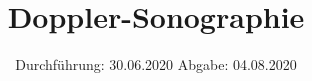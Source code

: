 

\subject{US3}
\title{Doppler-Sonographie}
\date{%
  Durchführung: 30.06.2020
  \hspace{3em}
  Abgabe: 04.08.2020
}



\maketitle
\thispagestyle{empty}
\tableofcontents
\newpage








\printbibliography{}


